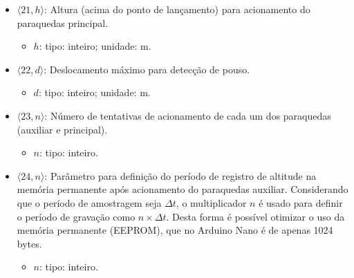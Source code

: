 \documentclass[portuguese,10pt,a4paper]{article}
\newcommand{\nexplanation}{definição do período de registro de altitude na memória permanente após acionamento do paraquedas auxiliar. Considerando que o período de amostragem seja $\Delta t$, o multiplicador $n$ é usado para definir o período de gravação como $n \times \Delta t$. Desta forma é possível otimizar o uso da memória permanente (EEPROM), que no Arduino Nano é de apenas 1024 bytes.}
\begin{document}
\begin{itemize}
	\item $\langle 21, h\rangle$: Altura (acima do ponto de lançamento) para acionamento do paraquedas principal.
	\begin{itemize}
		\item $h$: tipo: inteiro; unidade: m.
	\end{itemize}
	\item $\langle 22, d\rangle$: Deslocamento máximo para detecção de pouso.
	\begin{itemize}
		\item $d$: tipo: inteiro; unidade: m.
	\end{itemize}
	\item $\langle 23, n\rangle$: Número de tentativas de acionamento de cada um dos paraquedas (auxiliar e principal).
	\begin{itemize}
		\item $n$: tipo: inteiro.
	\end{itemize}
	\item $\langle 24, n\rangle$: 
		Parâmetro para \nexplanation
		\begin{itemize}
			\item $n$: tipo: inteiro.  
		\end{itemize}
\end{itemize}
\end{document}
